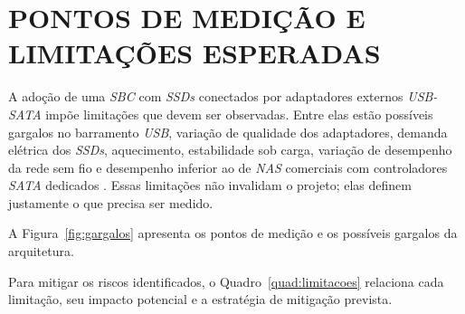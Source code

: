 \section{PONTOS DE MEDIÇÃO E LIMITAÇÕES ESPERADAS}

A adoção de uma \textit{SBC} com \textit{SSDs} conectados por adaptadores externos \textit{USB-SATA} impõe limitações que devem ser observadas. Entre elas estão possíveis gargalos no barramento \textit{USB}, variação de qualidade dos adaptadores, demanda elétrica dos \textit{SSDs}, aquecimento, estabilidade sob carga, variação de desempenho da rede sem fio e desempenho inferior ao de \textit{NAS} comerciais com controladores \textit{SATA} dedicados \cite{gamess2025}. Essas limitações não invalidam o projeto; elas definem justamente o que precisa ser medido.

A Figura~\ref{fig:gargalos} apresenta os pontos de medição e os possíveis gargalos da arquitetura.

\begin{figure}[H]
    \centering
    \fonteautoria
\end{figure}

Para mitigar os riscos identificados, o Quadro~\ref{quad:limitacoes} relaciona cada limitação, seu impacto potencial e a estratégia de mitigação prevista.

